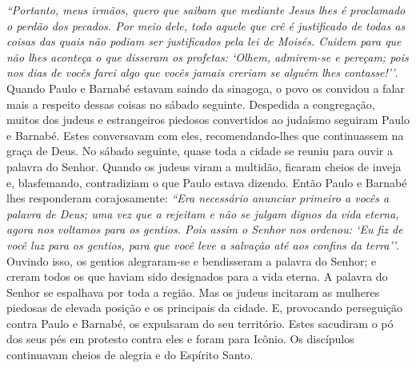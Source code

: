 \documentclass[
]{book}
\begin{document}
\emph{``Portanto, meus irmãos, quero que saibam que mediante Jesus lhes é proclamado o perdão dos pecados. Por meio dele, todo aquele que crê é justificado de todas as coisas das quais não podiam ser justificados pela lei de Moisés. Cuidem para que não lhes aconteça o que disseram os profetas: `Olhem, admirem-se e pereçam; pois nos dias de vocês farei algo que vocês jamais creriam se alguém lhes contasse!''}. Quando Paulo e Barnabé estavam saindo da sinagoga, o povo os convidou a falar mais a respeito dessas coisas no sábado seguinte. Despedida a congregação, muitos dos judeus e estrangeiros piedosos convertidos ao judaísmo seguiram Paulo e Barnabé. Estes conversavam com eles, recomendando-lhes que continuassem na graça de Deus. No sábado seguinte, quase toda a cidade se reuniu para ouvir a palavra do Senhor. Quando os judeus viram a multidão, ficaram cheios de inveja e, blasfemando, contradiziam o que Paulo estava dizendo. Então Paulo e Barnabé lhes responderam corajosamente: \emph{``Era necessário anunciar primeiro a vocês a palavra de Deus; uma vez que a rejeitam e não se julgam dignos da vida eterna, agora nos voltamos para os gentios. Pois assim o Senhor nos ordenou: `Eu fiz de você luz para os gentios, para que você leve a salvação até aos confins da terra''}. Ouvindo isso, os gentios alegraram-se e bendisseram a palavra do Senhor; e creram todos os que haviam sido designados para a vida eterna. A palavra do Senhor se espalhava por toda a região. Mas os judeus incitaram as mulheres piedosas de elevada posição e os principais da cidade. E, provocando perseguição contra Paulo e Barnabé, os expulsaram do seu território. Estes sacudiram o pó dos seus pés em protesto contra eles e foram para Icônio. Os discípulos continuavam cheios de alegria e do Espírito Santo.
\end{document}
